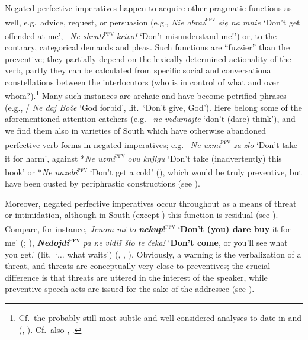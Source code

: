 \documentclass[output=paper,colorlinks,citecolor=brown]{langscibook}
\begin{document}
Negated perfective imperatives happen to acquire other pragmatic functions as well, e.g.\ advice, request, or persuasion (e.g.,  \textit{Nie obraź}\textsc{\textsuperscript{pfv}} \textit{się na mnie} `Don't get offended at me', \ \textit{Ne shvati}\textsc{\textsuperscript{pfv}} \textit{krivo!} `Don't misunderstand me!') or, to the contrary, categorical demands and pleas. Such functions are ``fuzzier'' than the preventive; they partially depend on the lexically determined actionality of the verb, partly they can be calculated from specific social and conversational constellations between the interlocutors (who is in control of what and over whom?).\footnote{Cf.\ the probably still most subtle and well-considered analyses to date in \citet[101--106]{Holvoet1989} and \citeauthor{Birjulin1992} (\citeyear{Birjulin1992}, \citeyear[\S4]{Birjulin1994}). Cf.\ also \citet[36--37]{Ivić1958}, \citet[22--26]{Laskowski1998}.} Many such instances are archaic and have become petrified phrases (e.g., / \textit{Ne daj Bože} `God forbid', lit.\ `Don't give, God'). Here belong some of the aforementioned attention catchers (e.g.\  \textit{ne vzdumajte} `don't (dare) think'), and we find them also in varieties of South  which have otherwise abandoned perfective verb forms in negated imperatives; e.g.\  \textit{Ne uzmi}\textsc{\textsuperscript{pfv}} \textit{za zlo} `Don't take it for harm', against *\textit{Ne uzmi}\textsc{\textsuperscript{pfv}} \textit{ovu knjigu} `Don't take (inadvertently) this book' or *\textit{Ne nazebi}\textsuperscript{\textsc{pfv}} `Don't get a cold' (\citealt[27--28]{Ivić1958}), which would be truly preventive, but have been ousted by periphrastic constructions (see ).

Moreover, negated perfective imperatives occur throughout  as a means of threat or intimidation, although in South  (except ) this function is residual (see ). Compare, for instance,  \textit{Jenom mi to} \textbf{\textit{nekup}}!\textsuperscript{\textsc{pfv}} `\textbf{Don't (you) dare buy} it for me' (\citealt[28--29]{Ivić1958}; \citealt[60--61]{Kopečný1962}),  \textbf{\textit{Nedojdi}\textsc{\textsuperscript{pfv}}} \textit{pa} \textit{\textsc{\'k}e} \textit{vidiš što te čeka!} `\textbf{Don't come}, or you'll see what you get.' (lit.\ `$\ldots$ what waits') (\citealt[416]{Koneski1976}, \citealt[346--347]{Tomić2012}, \citealt{Mitkovska2015}).  Obviously, a warning is the verbalization of a threat, and threats are conceptually very close to preventives; the crucial difference is that threats are uttered in the interest of the speaker, while preventive speech acts are issued for the sake of the addressee (see ).
\end{document}

